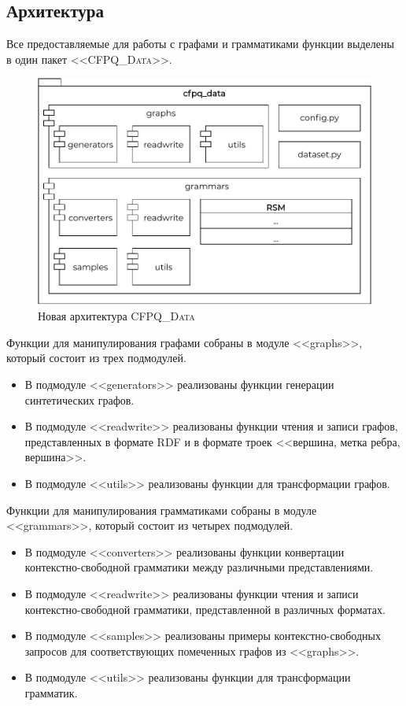 \subsection{Архитектура}

Все предоставляемые для работы с графами и грамматиками функции выделены в один пакет <<\textsc{CFPQ\_Data}>>.

\begin{figure}[h]
    \centering
    \includegraphics[width=\textwidth]{img/architecture_new.pdf}
    \caption{Новая архитектура \textsc{CFPQ\_Data}}
\end{figure}

Функции для манипулирования графами собраны в модуле <<graphs>>, который состоит из трех подмодулей.
\begin{itemize}
    \item В подмодуле <<generators>> реализованы функции генерации синтетических графов.
    \item В подмодуле <<readwrite>> реализованы функции чтения и записи графов, представленных в формате RDF и в формате троек <<вершина, метка ребра, вершина>>.
    \item В подмодуле <<utils>> реализованы функции для трансформации графов.
\end{itemize}

Функции для манипулирования грамматиками собраны в модуле <<grammars>>, который состоит из четырех подмодулей.
\begin{itemize}
    \item В подмодуле <<converters>> реализованы функции конвертации кон\-текстно-свобод\-ной грамматики между различными представлениями.
    \item В подмодуле <<readwrite>> реализованы функции чтения и записи кон\-текстно-свобод\-ной грамматики, представленной в различных форматах.
    \item В подмодуле <<samples>> реализованы примеры кон\-текстно-свобод\-ных запросов для соответствующих помеченных графов из <<graphs>>.
    \item В подмодуле <<utils>> реализованы функции для трансформации грамматик.
\end{itemize}

